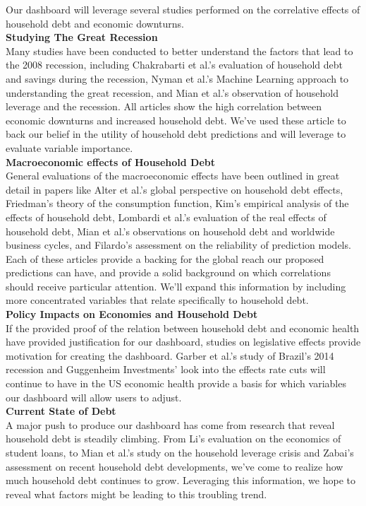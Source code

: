 \documentclass[sigconf,nonacm,11pt]{acmart}
\begin{document}
Our dashboard will leverage several studies performed on the correlative effects of household debt and economic downturns.\\
\textbf{Studying The Great Recession}\\
Many studies have been conducted to better understand the factors that lead to the 2008 recession, including Chakrabarti et al.'s evaluation of household debt and savings during the recession\cite{Chakrabarti2015}, Nyman et al.'s Machine Learning approach to understanding the great recession\cite{Nyman2018}, and Mian et al.'s observation of household leverage and the recession\cite{Mian2010}.  All articles show the high correlation between economic downturns and increased household debt. We've used these article to back our belief in the utility of household debt predictions and will leverage to evaluate variable importance.\\
\textbf{Macroeconomic effects of Household Debt}\\
General evaluations of the macroeconomic effects have been outlined in great detail in papers like Alter et al.'s global perspective on household debt effects\cite{Alter2018}, Friedman's theory of the consumption function\cite{Friedman1957}, Kim's empirical analysis of the effects of household debt\cite{Kim2016}, Lombardi et al.'s evaluation of the real effects of household debt\cite{Lombardi2017}, Mian et al.'s observations on household debt and worldwide business cycles\cite{Mian2015}\cite{Mian2018}, and Filardo's assessment on  the reliability of prediction models\cite{Filardo1999}. Each of these articles provide a backing for the global reach our proposed predictions can have, and provide a solid background on which correlations should receive particular attention. We'll expand this information by including more concentrated variables that relate specifically to household debt.\\
\textbf{Policy Impacts on Economies and Household Debt}\\
If the provided proof of the relation between household debt and economic health have provided justification for our dashboard, studies on legislative effects provide motivation for creating the dashboard.  Garber et al.'s study of Brazil's 2014 recession\cite{Garber2018} and Guggenheim Investments' look into the effects rate cuts will continue to have in the US economic health\cite{Guggenheim2019} provide a basis for which variables our dashboard will allow users to adjust.\\
\textbf{Current State of Debt}\\
A major push to produce our dashboard has come from research that reveal household debt is steadily climbing.  From Li's evaluation on the economics of student loans\cite{Li2013}, to Mian et al.'s study on the household leverage crisis\cite{Mian2011} and Zabai's assessment on recent household debt developments\cite{Zabai2017}, we've come to realize how much household debt continues to grow.  Leveraging this information, we hope to reveal what factors might be leading to this troubling trend.
\end{document}
